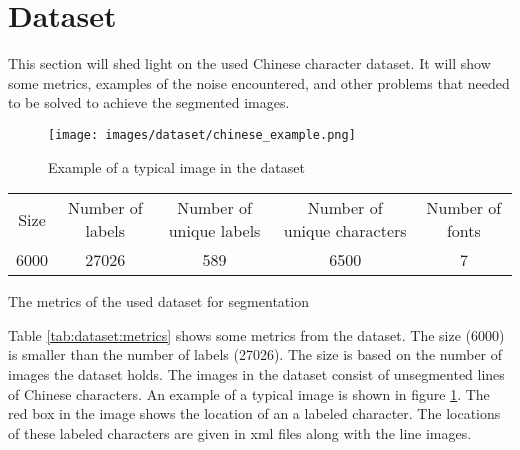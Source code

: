\section{Dataset} %
\label{sec:dataset}

This section will shed light on the used Chinese character dataset. It will show some metrics, examples of the noise encountered, and other problems that needed to be solved to achieve the segmented images.

\begin{figure}[ht]
 \centering
\texttt{[image: images/dataset/chinese\_example.png]}
 \caption{Example of a typical image in the dataset}
 \label{fig:dataset:chinese:example}
\end{figure}

\bigskip

\begin{minipage}{\linewidth}
\flushleft
{} \label{tab:dataset:metrics} 
\begin{tabular}{ c c c c c }
\hline
\hline
Size		& Number of labels 	& Number of unique labels	& Number of unique characters	& Number of fonts\\
6000 		& 27026				& 589						& 6500							& 7\\
\hline
\end{tabular}\par
\bigskip
The metrics of the used dataset for segmentation
\end{minipage}

\bigskip

\noindent Table \ref{tab:dataset:metrics} shows some metrics from the dataset. The size (6000) is smaller than the number of labels (27026). The size is based on the number of images the dataset holds. The images in the dataset consist of unsegmented lines of Chinese characters. An example of a typical image is shown in figure \ref{fig:dataset:chinese:example}. The red box in the image shows the location of an a labeled character. The locations of these labeled characters are given in xml files along with the line images.

